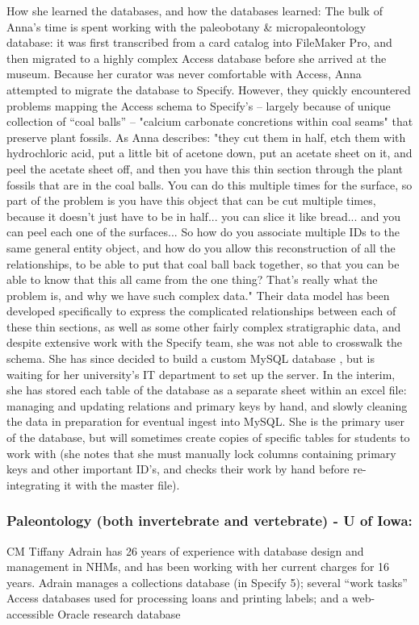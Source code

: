 How she learned the databases, and how the databases learned:  The bulk of Anna’s time is spent working with the paleobotany & micropaleontology database: it was first transcribed from a card catalog into FileMaker Pro, and then migrated to a highly complex Access database before she arrived at the museum.  Because her curator was never comfortable with Access, Anna attempted to migrate the database to Specify. However, they quickly encountered problems mapping the Access schema to Specify’s – largely because of unique collection of “coal balls” -- "calcium carbonate concretions within coal seams" that preserve plant fossils.  As Anna describes:
"they cut them in half, etch them with hydrochloric acid, put a little bit of acetone down, put an acetate sheet on it, and peel the acetate sheet off, and then you have this thin section through the plant fossils that are in the coal balls.  You can do this multiple times for the surface, so part of the problem is you have this object that can be cut multiple times, because it doesn't just have to be in half... you can slice it like bread... and you can peel each one of the surfaces...  So how do you associate multiple IDs to the same general entity object, and how do you allow this reconstruction of all the relationships, to be able to put that coal ball back together, so that you can be able to know that this all came from the one thing?  That's really what the problem is, and why we have such complex data."
Their data model has been developed specifically to express the complicated relationships between each of these thin sections, as well as some other fairly complex stratigraphic data, and despite extensive work with the Specify team, she was not able to crosswalk the schema.  She has since decided to build a custom MySQL database , but is waiting for her university’s IT department to set up the server.  In the interim, she has stored each table of the database as a separate sheet within an excel file: managing and updating relations and primary keys by hand, and slowly cleaning the data in preparation for eventual ingest into MySQL. She is the primary user of the database, but will sometimes create copies of specific tables for students to work with (she notes that she must manually lock columns containing primary keys and other important ID’s, and checks their work by hand before re-integrating it with the master file).

\subsubsection{Paleontology (both invertebrate and vertebrate) - U of Iowa:}
CM Tiffany Adrain has 26 years of experience with database design and management in NHMs, and has been working with her current charges for 16 years.  Adrain manages a collections database (in Specify 5); several “work tasks” Access databases used for processing loans and printing labels; and a web-accessible Oracle research database 


